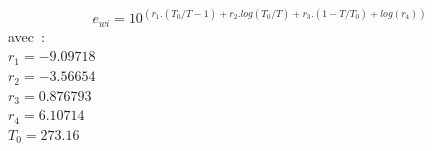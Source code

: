 $$
e_{wi} = 10^{ \left( \displaystyle
           r_1.(T_0/T - 1) + r_2 .log(T_0/T) + r_3.(1 - T/T_0) + log(r_4)
         \right) }
$$
avec~:\\
$r_1 = -9.09718 $ \\
$r_2 = -3.56654 $ \\
$r_3 = 0.876793 $ \\
$r_4 = 6.10714 $ \\
$T_0 = 273.16 $ \\
